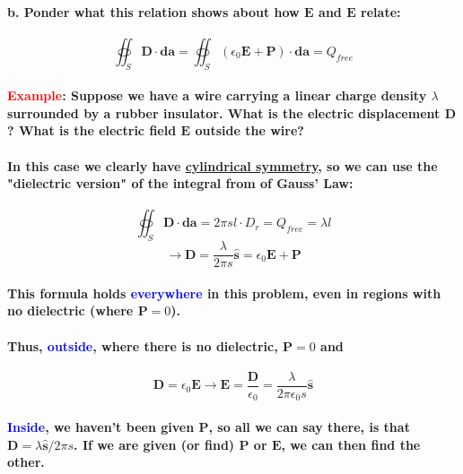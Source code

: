 \documentclass{article}
\begin{document}
\paragraph{\indent b. Ponder what this relation shows about how $\boldsymbol{E}$ and $\boldsymbol{E}$ relate:}
\begin{equation*}
    \oiint_S \boldsymbol{D}\cdot \boldsymbol{da}=\oiint_S (\epsilon_0\boldsymbol{E}+\boldsymbol{P})\cdot\boldsymbol{da}=Q_{free}
\end{equation*}
\paragraph{\textcolor{red}{Example}: Suppose we have a wire carrying a linear charge density $\lambda$ surrounded by a rubber insulator. What is the electric displacement $\boldsymbol{D}$? What is the electric field $\boldsymbol{E}$ outside the wire?}
\paragraph{In this case we clearly have \underline{cylindrical symmetry}, so we can use the "dielectric version" of the integral from of Gauss' Law:}
\begin{equation*}
    \oiint_S \boldsymbol{D}\cdot\boldsymbol{da} =2\pi sl\cdot D_r=Q_{free}=\lambda l
\end{equation*}
\begin{equation*}
    \rightarrow \boldsymbol{D}=\frac{\lambda}{2\pi s}\hat{\boldsymbol{s}}=\epsilon_0\boldsymbol{E}+\boldsymbol{P}
\end{equation*}
\paragraph{This formula holds \textcolor{blue}{everywhere} in this problem, even in regions with no dielectric (where $\boldsymbol{P}=0$).}
\paragraph{Thus, \textcolor{blue}{outside}, where there is no dielectric, $\boldsymbol{P}=0$ and }
\begin{equation*}
    \boldsymbol{D}=\epsilon_0\boldsymbol{E}\rightarrow \boldsymbol{E}=\frac{\boldsymbol{D}}{\epsilon_0}=\frac{\lambda}{2\pi\epsilon_0s}\hat{\boldsymbol{s}}
\end{equation*}
\paragraph{\textcolor{blue}{Inside}, we haven't been given $\boldsymbol{P}$, so all we can say there, is that $\boldsymbol{D}=\lambda\hat{\boldsymbol{s}}/2\pi s$. If we are given (or find) $\boldsymbol{P}$ or $\boldsymbol{E}$, we can then find the other.}
\end{document}
